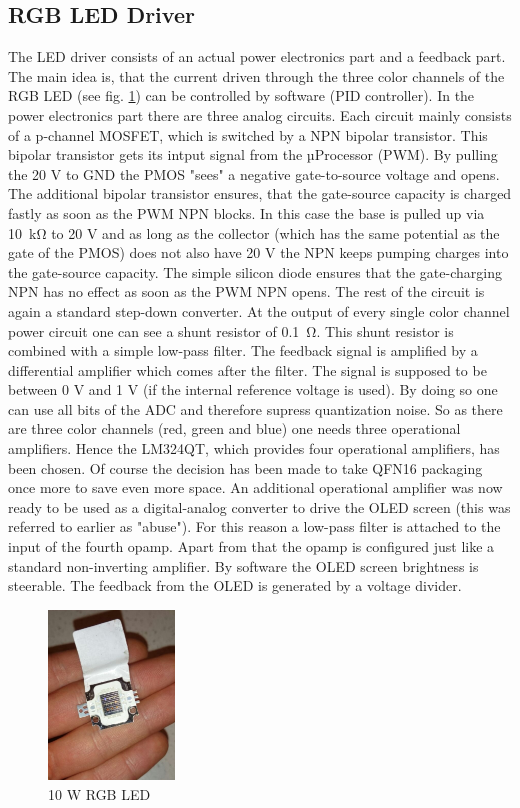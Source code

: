 \subsection{RGB LED Driver}
The LED driver consists of an actual power electronics part and a feedback part. The main idea is, that the current driven through the three color channels of the RGB LED (see fig. \ref{fig:led}) can be controlled by software (PID controller). In the power electronics part there are three analog circuits. Each circuit mainly consists of a p-channel MOSFET, which is switched by a NPN bipolar transistor. This bipolar transistor gets its intput signal from the µProcessor (PWM). By pulling the 20 V to GND the PMOS "sees" a negative gate-to-source voltage and opens. The additional bipolar transistor ensures, that the gate-source capacity is charged fastly as soon as the PWM NPN blocks. In this case the base is pulled up via \SI{10}{\kilo\ohm} to 20 V and as long as the collector (which has the same potential as the gate of the PMOS) does not also have 20 V the NPN keeps pumping charges into the gate-source capacity. The simple silicon diode ensures that the gate-charging NPN has no effect as soon as the PWM NPN opens. The rest of the circuit is again a standard step-down converter. At the output of every single color channel power circuit one can see a shunt resistor of \SI{0.1}{\ohm}. This shunt resistor is combined with a simple low-pass filter. The feedback signal is amplified by a differential amplifier which comes after the filter. The signal is supposed to be between 0 V and 1 V (if the internal reference voltage is used). By doing so one can use all bits of the ADC and therefore supress quantization noise. 
\newpar
So as there are three color channels (red, green and blue) one needs three operational amplifiers. Hence the LM324QT, which provides four operational amplifiers, has been chosen. Of course the decision has been made to take QFN16 packaging once more to save even more space. An additional operational amplifier was now ready to be used as a digital-analog converter to drive the OLED screen (this was referred to earlier as "abuse"). For this reason a low-pass filter is attached to the input of the fourth opamp. Apart from that the opamp is configured just like a standard non-inverting amplifier. By software the OLED screen brightness is steerable. The feedback from the OLED is generated by a voltage divider. 
\begin{figure}
	\centering
	\includegraphics[width=0.3\textwidth]{./fig/led.jpg}
	\caption{10 W RGB LED}
	\label{fig:led}
\end{figure}                    
